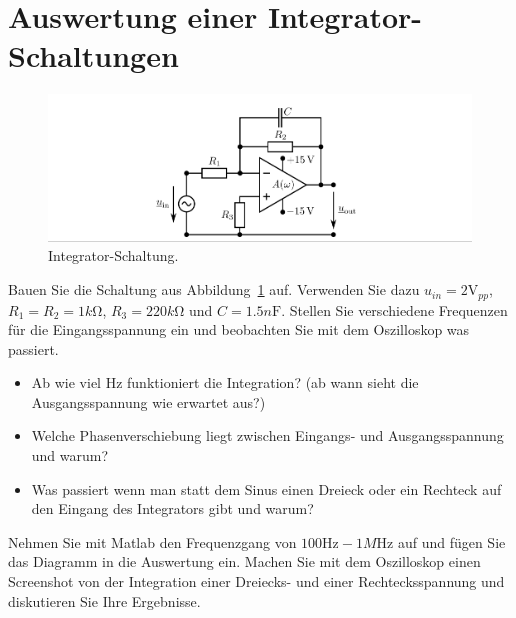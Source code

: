\documentclass[10pt]{scrreprt}
\begin{document}
    \section{Auswertung einer Integrator-Schaltungen}
    \begin{center}
        \begin{figure}[H]
            \includegraphics[width=\textwidth]{abb15.png}
            \caption{Integrator-Schaltung.}
            \label{fig:abb15}
        \end{figure}
    \end{center}
    Bauen Sie die Schaltung aus Abbildung~\ref{fig:abb15} auf.
    Verwenden Sie dazu $u_{in} = 2\si{\volt}_{pp}$, $R_1 = R_2 = 1\si{k\ohm}$, $R_3 = 220\si{k\ohm}$ und $C = 1.5\si{n\farad}$.
    Stellen Sie verschiedene Frequenzen für die Eingangsspannung ein und beobachten Sie
    mit dem Oszilloskop was passiert.
    \begin{itemize}
        \item Ab wie viel Hz funktioniert die Integration? (ab wann sieht die Ausgangsspannung
            wie erwartet aus?)
        \item Welche Phasenverschiebung liegt zwischen Eingangs- und Ausgangsspannung und
            warum?
        \item Was passiert wenn man statt dem Sinus einen Dreieck oder ein Rechteck auf den
            Eingang des Integrators gibt und warum?
    \end{itemize}
    Nehmen Sie mit Matlab den Frequenzgang von $100\si{\hertz} - 1\si{M\hertz}$ auf und fügen Sie das
    Diagramm in die Auswertung ein.
    Machen Sie mit dem Oszilloskop einen Screenshot von der Integration einer Dreiecks- und
    einer Rechtecksspannung und diskutieren Sie Ihre Ergebnisse.
\end{document}
